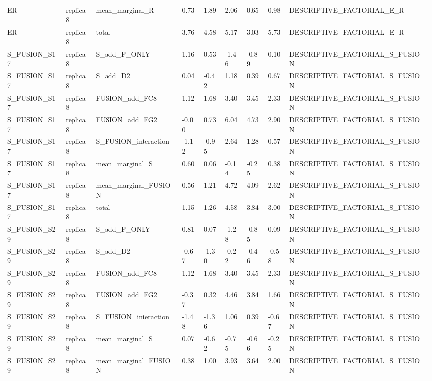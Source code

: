 \begin{tabular}{lllllllll}
ER & replica8 & mean\_marginal\_R & 0.73 & 1.89 & 2.06 & 0.65 & 0.98 & DESCRIPTIVE\_FACTORIAL\_E\_R \\
ER & replica8 & total & 3.76 & 4.58 & 5.17 & 3.03 & 5.73 & DESCRIPTIVE\_FACTORIAL\_E\_R \\
S\_FUSION\_S17 & replica8 & S\_add\_F\_ONLY & 1.16 & 0.53 & -1.46 & -0.89 & 0.10 & DESCRIPTIVE\_FACTORIAL\_S\_FUSION \\
S\_FUSION\_S17 & replica8 & S\_add\_D2 & 0.04 & -0.42 & 1.18 & 0.39 & 0.67 & DESCRIPTIVE\_FACTORIAL\_S\_FUSION \\
S\_FUSION\_S17 & replica8 & FUSION\_add\_FC8 & 1.12 & 1.68 & 3.40 & 3.45 & 2.33 & DESCRIPTIVE\_FACTORIAL\_S\_FUSION \\
S\_FUSION\_S17 & replica8 & FUSION\_add\_FG2 & -0.00 & 0.73 & 6.04 & 4.73 & 2.90 & DESCRIPTIVE\_FACTORIAL\_S\_FUSION \\
S\_FUSION\_S17 & replica8 & S\_FUSION\_interaction & -1.12 & -0.95 & 2.64 & 1.28 & 0.57 & DESCRIPTIVE\_FACTORIAL\_S\_FUSION \\
S\_FUSION\_S17 & replica8 & mean\_marginal\_S & 0.60 & 0.06 & -0.14 & -0.25 & 0.38 & DESCRIPTIVE\_FACTORIAL\_S\_FUSION \\
S\_FUSION\_S17 & replica8 & mean\_marginal\_FUSION & 0.56 & 1.21 & 4.72 & 4.09 & 2.62 & DESCRIPTIVE\_FACTORIAL\_S\_FUSION \\
S\_FUSION\_S17 & replica8 & total & 1.15 & 1.26 & 4.58 & 3.84 & 3.00 & DESCRIPTIVE\_FACTORIAL\_S\_FUSION \\
S\_FUSION\_S29 & replica8 & S\_add\_F\_ONLY & 0.81 & 0.07 & -1.28 & -0.85 & 0.09 & DESCRIPTIVE\_FACTORIAL\_S\_FUSION \\
S\_FUSION\_S29 & replica8 & S\_add\_D2 & -0.67 & -1.30 & -0.22 & -0.46 & -0.58 & DESCRIPTIVE\_FACTORIAL\_S\_FUSION \\
S\_FUSION\_S29 & replica8 & FUSION\_add\_FC8 & 1.12 & 1.68 & 3.40 & 3.45 & 2.33 & DESCRIPTIVE\_FACTORIAL\_S\_FUSION \\
S\_FUSION\_S29 & replica8 & FUSION\_add\_FG2 & -0.37 & 0.32 & 4.46 & 3.84 & 1.66 & DESCRIPTIVE\_FACTORIAL\_S\_FUSION \\
S\_FUSION\_S29 & replica8 & S\_FUSION\_interaction & -1.48 & -1.36 & 1.06 & 0.39 & -0.67 & DESCRIPTIVE\_FACTORIAL\_S\_FUSION \\
S\_FUSION\_S29 & replica8 & mean\_marginal\_S & 0.07 & -0.62 & -0.75 & -0.66 & -0.25 & DESCRIPTIVE\_FACTORIAL\_S\_FUSION \\
S\_FUSION\_S29 & replica8 & mean\_marginal\_FUSION & 0.38 & 1.00 & 3.93 & 3.64 & 2.00 & DESCRIPTIVE\_FACTORIAL\_S\_FUSION \\

\end{tabular}

